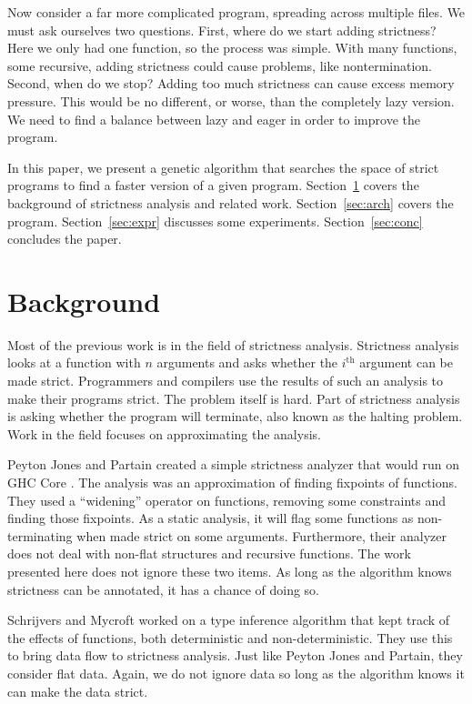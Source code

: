 \documentclass[preprint,nocopyrightspace]{sigplanconf}
\begin{document}
Now consider a far more complicated program, spreading across multiple files. We must ask ourselves two questions. First, where do we start adding strictness? Here we only had one function, so the process was simple. With many functions, some recursive, adding strictness could cause problems, like nontermination. Second, when do we stop? Adding too much strictness can cause excess memory pressure. This would be no different, or worse, than the completely lazy version. We need to find a balance between lazy and eager in order to improve the program.

In this paper, we present a genetic algorithm that searches the space of strict programs to find a faster version of a given program. Section~\ref{sec:back} covers the background of strictness analysis and related work. Section~\ref{sec:arch} covers the program. Section~\ref{sec:expr} discusses some experiments. Section~\ref{sec:conc} concludes the paper.

\section{Background}\label{sec:back}
Most of the previous work is in the field of strictness analysis. Strictness analysis looks at a function with $n$ arguments and asks whether the $i^{\text{th}}$ argument can be made strict. Programmers and compilers use the results of such an analysis to make their programs strict. The problem itself is hard. Part of strictness analysis is asking whether the program will terminate, also known as the halting problem. Work in the field focuses on approximating the analysis.

Peyton Jones and Partain created a simple strictness analyzer that would run on GHC Core \cite{pjones}. The analysis was an approximation of finding fixpoints of functions. They used a ``widening'' operator on functions, removing some constraints and finding those fixpoints. As a static analysis, it will flag some functions as non-terminating when made strict on some arguments. Furthermore, their analyzer does not deal with non-flat structures and recursive functions. The work presented here does not ignore these two items. As long as the algorithm knows strictness can be annotated, it has a chance of doing so.

Schrijvers and Mycroft worked on a type inference algorithm that kept track of the effects of functions, both deterministic and non-deterministic\cite{mycroft}. They use this to bring data flow to strictness analysis. Just like Peyton Jones and Partain, they consider flat data. Again, we do not ignore data so long as the algorithm knows it can make the data strict.
\end{document}
